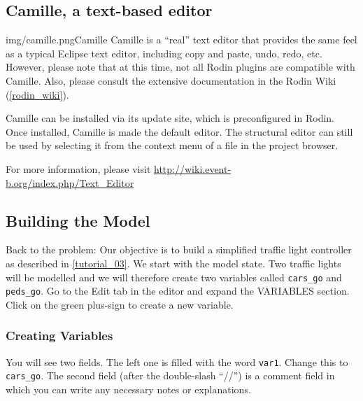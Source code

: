 \subsection{Camille, a text-based editor}
\label{camille}

\begin{rodin-plugin}{img/camille.png}{Camille}
Camille is a ``real'' text editor that provides the same feel as a typical Eclipse text editor, including copy and paste, undo, redo, etc.  However, please note that at this time, not all Rodin plugins are compatible with Camille.  Also, please consult the extensive documentation in the Rodin Wiki (\ref{rodin_wiki}).

Camille can be installed via its update site, which is preconfigured in Rodin.  Once installed, Camille is made the default editor.  The structural editor can still be used by selecting it from the context menu of a file in the project browser.

For more information, please visit \url{http://wiki.event-b.org/index.php/Text_Editor}

\end{rodin-plugin}

\subsection{Building the Model}

Back to the problem: Our objective is to build a simplified traffic light controller as described in \ref{tutorial_03}.  We start with the model state.  Two traffic lights will be modelled and we will therefore create two variables called  \texttt{cars\_go} and \texttt{peds\_go}.  Go to the \textsf{Edit} tab in the editor and expand the \textsf{VARIABLES} section.  Click on the green plus-sign to create a new variable.

\subsubsection{Creating Variables}

You will see two fields. The left one is filled with the word \texttt{var1}.  Change this to \texttt{cars\_go}.  The second field (after the double-slash ``//'') is a comment field in which you can write any necessary notes or explanations.


